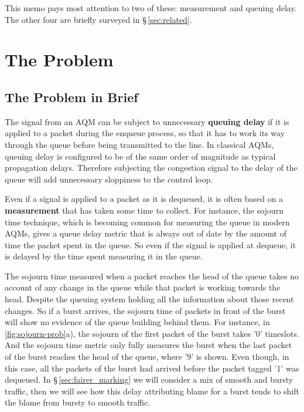 This memo pays most attention to two of these: measurement and queuing delay. The other four are briefly surveyed in \S\,\ref{sec:related}.

\section{The Problem}\label{sigqdyntr_problem}
\subsection{The Problem in Brief}\label{sigqdyntr_problem_brief}
The signal from an AQM can be subject to unnecessary \textbf{queuing delay} if it is applied to a packet during the enqueue process, so that it has to work its way through the queue before being transmitted to the line. In classical AQMs, queuing delay is configured to be of the same order of magnitude as typical propagation delays. Therefore subjecting the congestion signal to the delay of the queue will add unnecessary sloppiness to the control loop.

Even if a signal is applied to a packet as it is dequeued, it is often based on a \textbf{measurement} that has taken some time to collect. For instance, the sojourn time technique, which is becoming common for measuring the queue in modern AQMs, gives a queue delay metric that is always out of date by the amount of time the packet spent in the queue. So even if the signal is applied at dequeue, it is delayed by the time spent measuring it in the queue.

The sojourn time measured when a packet reaches the head of the queue takes no account of any change in the queue while that packet is working towards the head. Despite the queuing system holding all the information about those recent changes. So if a burst arrives, the sojourn time of packets in front of the burst will show no evidence of the queue building behind them. For instance, in \autoref{fig:sojourn-prob}a), the sojourn of the first packet of the burst takes '0' timeslots. And the sojourn time metric only fully measures the burst when the last packet of the burst reaches the head of the queue, where '9' is shown. Even though, in this case, all the packets of the burst had arrived before the packet tagged '1' was dequeued. In \S\,\ref{sec:fairer_marking} we will consider a mix of smooth and bursty traffic, then we will see how this delay attributing blame for a burst tends to shift the blame from bursty to smooth traffic.

